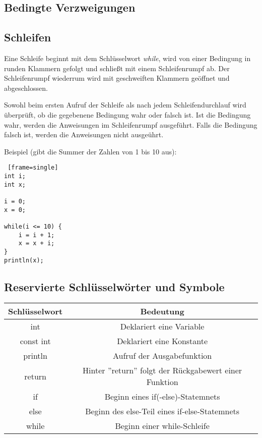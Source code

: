 \subsection{Bedingte Verzweigungen}


\subsection{Schleifen}
Eine Schleife beginnt mit dem Schlüsselwort \textit{while}, wird von einer Bedingung in runden Klammern gefolgt und schließt mit einem Schleifenrumpf ab. Der Schleifenrumpf wiederrum wird mit geschweiften Klammern geöffnet und abgeschlossen.

Sowohl beim ersten Aufruf der Schleife als nach jedem Schleifendurchlauf wird überprüft, ob die gegebenene Bedingung wahr oder falsch ist. Ist die Bedingung wahr, werden die Anweisungen im Schleifenrumpf ausgeführt. Falls die Bedingung falsch ist, werden die Anweisungen nicht ausgeührt.

Beispiel (gibt die Summer der Zahlen von 1 bis 10 aus):
\begin{lstlisting} [frame=single] 
int i;
int x;

i = 0;
x = 0;

while(i <= 10) {
	i = i + 1;
	x = x + i;
}
println(x);
\end{lstlisting}
	
\subsection{Reservierte Schlüsselwörter und Symbole}	

\begin{center}
  \begin{tabular}{ | c | c | }
    \hline
    Schlüsselwort & Bedeutung\\ \hline \hline
    int & Deklariert eine Variable\\ \hline
    const int & Deklariert eine Konstante\\ \hline
    println & Aufruf der Ausgabefunktion\\ \hline
    return & Hinter ''return'' folgt der Rückgabewert einer Funktion\\ \hline
    if & Beginn eines if(-else)-Statemnets\\ \hline
    else & Beginn des else-Teil eines if-else-Statemnets\\ \hline
    while & Beginn einer while-Schleife\\ \hline
    
  \end{tabular}
\end{center}


